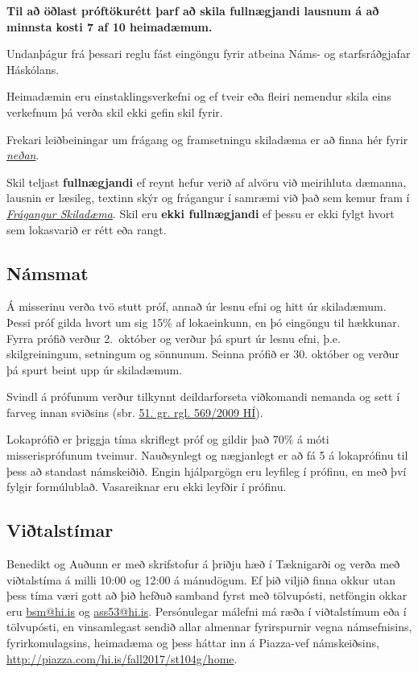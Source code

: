 \documentclass[a4paper,10pt,icelandic]{sphinxmanual}
\begin{document}
\begin{center}\textbf{Til að öðlast próftökurétt þarf að skila fullnægjandi lausnum á
að minnsta kosti 7 af 10 heimadæmum.}
\end{center}
Undanþágur frá þessari reglu fást eingöngu fyrir atbeina Náms- og starfsráðgjafar Háskólans.

Heimadæmin eru einstaklingsverkefni og ef tveir eða fleiri nemendur skila
eins verkefnum þá verða skil ekki gefin skil fyrir.

Frekari leiðbeiningar um frágang og framsetningu skiladæma er að finna
hér fyrir {\hyperref[vidauki:fragangurskiladaema]{\emph{neðan}}}.

Skil teljast \textbf{fullnægjandi} ef reynt hefur verið af alvöru við meirihluta
dæmanna, lausnin er læsileg, textinn skýr og frágangur í samræmi við það sem
kemur fram í {\hyperref[vidauki:fragangurskiladaema]{\emph{Frágangur Skiladæma}}}.
Skil eru \textbf{ekki fullnægjandi} ef þessu er ekki fylgt hvort sem
lokasvarið er rétt eða rangt.


\subsection{Námsmat}
\label{vidauki:namsmat}
Á misserinu verða tvö stutt próf, annað úr lesnu efni og
hitt úr skiladæmum. Þessi próf gilda hvort um sig 15\% af lokaeinkunn, en
þó eingöngu til hækkunar. Fyrra prófið verður 2. október og verður þá
spurt úr lesnu efni, þ.e. skilgreiningum, setningum og sönnunum. Seinna
prófið er 30. október og verður þá spurt beint upp úr skiladæmum.

Svindl á prófunum verður
tilkynnt deildarforseta viðkomandi nemanda og sett í
farveg innan sviðsins (sbr.
\href{http://www.hi.is/adalvefur/reglur\_fyrir\_haskola\_islands\#51}{51. gr. rgl. 569/2009 HÍ}).

Lokaprófið er þriggja tíma skriflegt próf og gildir það 70\% á móti
misserisprófunum tveimur. Nauðsynlegt og nægjanlegt er að fá 5 á
lokaprófinu til þess að standast námskeiðið. Engin hjálpargögn eru
leyfileg í prófinu, en með því fylgir formúlublað.
Vasareiknar eru ekki leyfðir í prófinu.


\subsection{Viðtalstímar}
\label{vidauki:vitalstimar}
Benedikt og Auðunn er með skrifstofur á þriðju hæð í Tæknigarði
og verða með viðtalstíma á milli 10:00 og 12:00 á
mánudögum. Ef þið viljið finna okkur utan þess tíma væri gott að þið
hefðuð samband fyrst með tölvupósti, netföngin okkar eru \href{mailto:bsm@hi.is}{bsm@hi.is}
og \href{mailto:ass53@hi.is}{ass53@hi.is}. Persónulegar málefni má ræða í viðtalstímum eða í
tölvupósti, en vinsamlegast sendið allar almennar fyrirspurnir vegna
námsefnisins, fyrirkomulagsins, heimadæma og þess háttar inn á Piazza-vef
námskeiðsins, \href{http://piazza.com/hi.is/fall2017/st104g/home}{http://piazza.com/hi.is/fall2017/st104g/home}.
\end{document}
